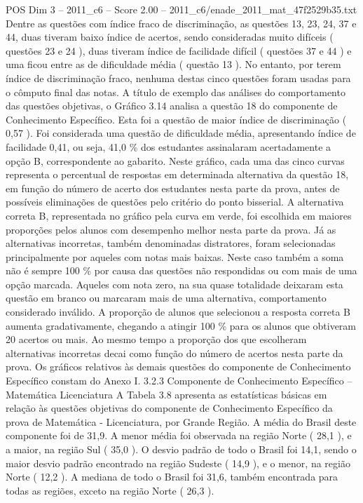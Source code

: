 \begin{textsample}{POS Dim 3 – 2011\_c6 – Score 2.00 – 2011\_c6/enade\_2011\_mat\_47f2529b35.txt}
Dentre as questões com índice fraco de discriminação, as questões 13, 23, 24, 37 e 44, duas tiveram baixo índice de acertos, sendo consideradas muito difíceis ( questões 23 e 24 ), duas tiveram índice de facilidade difícil ( questões 37 e 44 ) e uma ficou entre as de dificuldade média ( questão 13 ).
No entanto, por terem índice de discriminação fraco, nenhuma destas cinco questões foram usadas para o cômputo final das notas.
A título de exemplo das análises do comportamento das questões objetivas, o Gráfico 3.14 analisa a questão 18 do componente de Conhecimento Específico.
Esta foi a questão de maior índice de discriminação ( 0,57 ).
Foi considerada uma questão de dificuldade média, apresentando índice de facilidade 0,41, ou seja, 41,0 \% dos estudantes assinalaram acertadamente a opção B, correspondente ao gabarito.
Neste gráfico, cada uma das cinco curvas representa o percentual de respostas em determinada alternativa da questão 18, em função do número de acerto dos estudantes nesta parte da prova, antes de possíveis eliminações de questões pelo critério do ponto bisserial.
A alternativa correta B, representada no gráfico pela curva em verde, foi escolhida em maiores proporções pelos alunos com desempenho melhor nesta parte da prova.
Já as alternativas incorretas, também denominadas distratores, foram selecionadas principalmente por aqueles com notas mais baixas.
Neste caso também a soma não é sempre 100 \% por causa das questões não respondidas ou com mais de uma opção marcada.
Aqueles com nota zero, na sua quase totalidade deixaram esta questão em branco ou marcaram mais de uma alternativa, comportamento considerado inválido.
A proporção de alunos que selecionou a resposta correta B aumenta gradativamente, chegando a atingir 100 \% para os alunos que obtiveram 20 acertos ou mais.
Ao mesmo tempo a proporção dos que escolheram alternativas incorretas decai como função do número de acertos nesta parte da prova.
Os gráficos relativos às demais questões do componente de Conhecimento Específico constam do Anexo I. 3.2.3 Componente de Conhecimento Específico – Matemática Licenciatura A Tabela 3.8 apresenta as estatísticas básicas em relação às questões objetivas do componente de Conhecimento Específico da prova de Matemática - Licenciatura, por Grande Região.
A média do Brasil deste componente foi de 31,9.
A menor média foi observada na região Norte ( 28,1 ), e a maior, na região Sul ( 35,0 ).
O desvio padrão de todo o Brasil foi 14,1, sendo o maior desvio padrão encontrado na região Sudeste ( 14,9 ), e o menor, na região Norte ( 12,2 ).
A mediana de todo o Brasil foi 31,6, também encontrada para todas as regiões, exceto na região Norte ( 26,3 ).

\end{textsample}
